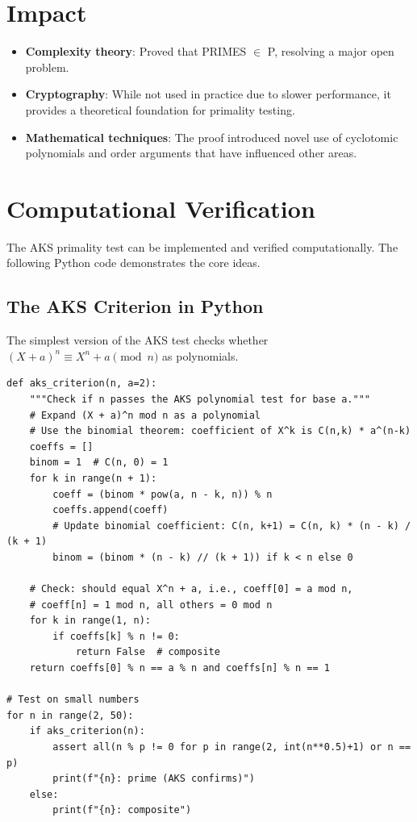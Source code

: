 \section{Impact}

\begin{itemize}
\item \textbf{Complexity theory}: Proved that PRIMES $\in$ P, resolving a major open problem.
\item \textbf{Cryptography}: While not used in practice due to slower performance, it provides a theoretical foundation for primality testing.
\item \textbf{Mathematical techniques}: The proof introduced novel use of cyclotomic polynomials and order arguments that have influenced other areas.
\end{itemize}

\section{Computational Verification}

The AKS primality test can be implemented and verified computationally. The following Python code demonstrates the core ideas.

\subsection{The AKS Criterion in Python}

The simplest version of the AKS test checks whether $(X+a)^n \equiv X^n + a \pmod{n}$ as polynomials.

\begin{verbatim}
def aks_criterion(n, a=2):
    """Check if n passes the AKS polynomial test for base a."""
    # Expand (X + a)^n mod n as a polynomial
    # Use the binomial theorem: coefficient of X^k is C(n,k) * a^(n-k)
    coeffs = []
    binom = 1  # C(n, 0) = 1
    for k in range(n + 1):
        coeff = (binom * pow(a, n - k, n)) % n
        coeffs.append(coeff)
        # Update binomial coefficient: C(n, k+1) = C(n, k) * (n - k) / (k + 1)
        binom = (binom * (n - k) // (k + 1)) if k < n else 0

    # Check: should equal X^n + a, i.e., coeff[0] = a mod n,
    # coeff[n] = 1 mod n, all others = 0 mod n
    for k in range(1, n):
        if coeffs[k] % n != 0:
            return False  # composite
    return coeffs[0] % n == a % n and coeffs[n] % n == 1

# Test on small numbers
for n in range(2, 50):
    if aks_criterion(n):
        assert all(n % p != 0 for p in range(2, int(n**0.5)+1) or n == p)
        print(f"{n}: prime (AKS confirms)")
    else:
        print(f"{n}: composite")
\end{verbatim}

